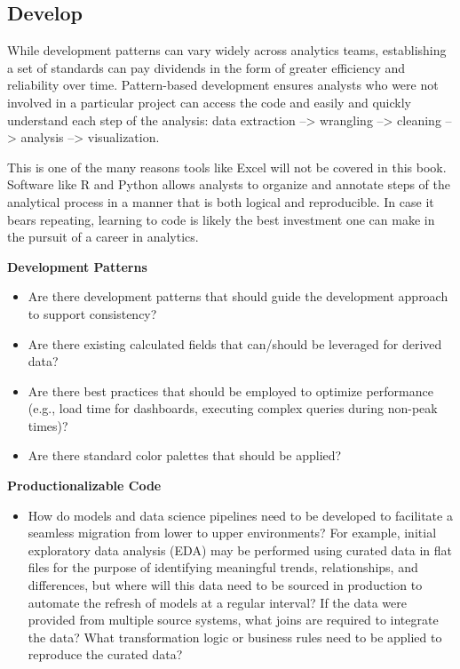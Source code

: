 \documentclass[]{book}
\providecommand{\tightlist}{%
  \setlength{\itemsep}{0pt}\setlength{\parskip}{0pt}}
\begin{document}
\hypertarget{develop}{%
\subsection{Develop}\label{develop}}

While development patterns can vary widely across analytics teams, establishing a set of standards can pay dividends in the form of greater efficiency and reliability over time. Pattern-based development ensures analysts who were not involved in a particular project can access the code and easily and quickly understand each step of the analysis: data extraction --\textgreater{} wrangling --\textgreater{} cleaning --\textgreater{} analysis --\textgreater{} visualization.

This is one of the many reasons tools like Excel will not be covered in this book. Software like R and Python allows analysts to organize and annotate steps of the analytical process in a manner that is both logical and reproducible. In case it bears repeating, learning to code is likely the best investment one can make in the pursuit of a career in analytics.

\textbf{Development Patterns}

\begin{itemize}
\tightlist
\item
  Are there development patterns that should guide the development approach to support consistency?
\item
  Are there existing calculated fields that can/should be leveraged for derived data?
\item
  Are there best practices that should be employed to optimize performance (e.g., load time for dashboards, executing complex queries during non-peak times)?
\item
  Are there standard color palettes that should be applied?
\end{itemize}

\textbf{Productionalizable Code}

\begin{itemize}
\tightlist
\item
  How do models and data science pipelines need to be developed to facilitate a seamless migration from lower to upper environments? For example, initial exploratory data analysis (EDA) may be performed using curated data in flat files for the purpose of identifying meaningful trends, relationships, and differences, but where will this data need to be sourced in production to automate the refresh of models at a regular interval? If the data were provided from multiple source systems, what joins are required to integrate the data? What transformation logic or business rules need to be applied to reproduce the curated data?
\end{itemize}
\end{document}
